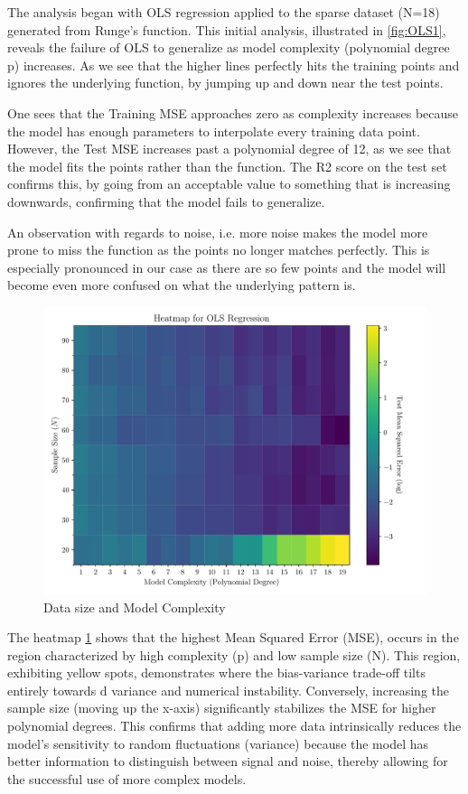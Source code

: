 \documentclass[twocolumn,aps]{revtex4}
\begin{document}
The analysis began with OLS regression applied to the sparse dataset (N=18) generated from Runge’s function. 
This initial analysis, illustrated in \ref{fig:OLS1}, reveals the failure of OLS to generalize as model complexity (polynomial degree p) increases. 
As we see that the higher lines perfectly hits the training points and ignores the underlying function, by jumping up and down near the test points.

One sees that the Training MSE approaches zero as complexity increases because the model has enough parameters to interpolate every training data point. 
However, the Test MSE increases past a polynomial degree of 12, as we see that the model fits the points rather than the function.
The R2 score on the test set confirms this, by going from an acceptable value to something that is increasing downwards, confirming that the model fails to generalize.

An observation with regards to noise, i.e. more noise makes the model more prone to miss the function as the points no longer matches perfectly. This is especially pronounced in our case as there are so few points and the model will become even more confused on what the underlying pattern is.
\begin{figure}[H]
    \centering
    \includegraphics[width=.95 \linewidth]{Figures/OLS_Heatmap.pdf}
    \caption{Data size and Model Complexity}
    \label{fig:OLSHeat}
\end{figure}


The heatmap \ref{fig:OLSHeat} shows that the highest Mean Squared Error (MSE), occurs in the region characterized by high complexity (p) and low sample size (N). 
This region, exhibiting yellow spots, demonstrates where the bias-variance trade-off tilts entirely towards d variance and numerical instability. 
Conversely, increasing the sample size (moving up the x-axis) significantly stabilizes the MSE for higher polynomial degrees. 
This confirms that adding more data intrinsically reduces the model's sensitivity to random fluctuations (variance) because the model has better information to distinguish between signal and noise, thereby allowing for the successful use of more complex models.
\end{document}
